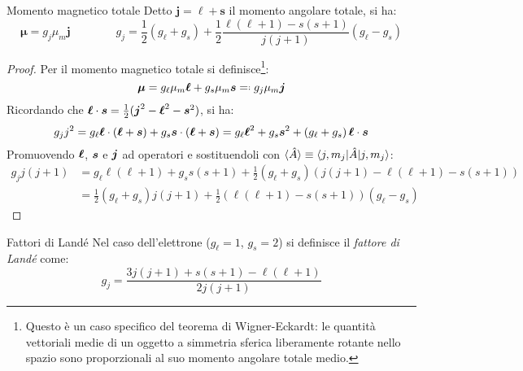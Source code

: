 \begin{proposition}{Momento magnetico totale}{}
	Detto $ \boldsymbol{j} = \boldsymbol{\ell} + \boldsymbol{s} $ il momento angolare totale, si ha:
	\begin{equation}
		\boldsymbol{\mu} = g_j \mu_m \boldsymbol{j}
		\qquad \qquad
		g_j = \frac{1}{2} \left( g_\ell + g_s \right) + \frac{1}{2} \frac{\ell (\ell + 1) - s (s + 1)}{j (j + 1)} \left( g_\ell - g_s \right)
	\end{equation}

	\tcblower

	\begin{proof}
		Per il momento magnetico totale si definisce\footnote{Questo è un caso specifico del teorema di Wigner-Eckardt: le quantità vettoriali medie di un oggetto a simmetria sferica liberamente rotante nello spazio sono proporzionali al suo momento angolare totale medio.}:
		\begin{equation*}
			\bs{\mu} = g_\ell \mu_m \bs{\ell} + g_s \mu_m \bs{s} \eqdef g_j \mu_m \bs{j}
		\end{equation*}
		Ricordando che $ \boldsymbol{\ell} \cdot \boldsymbol{s} = \frac{1}{2} ( \boldsymbol{j}^2 - \boldsymbol{\ell}^2 - \boldsymbol{s}^2 ) $, si ha:
		\begin{equation*}
			g_j j^2 = g_\ell \boldsymbol{\ell} \cdot \left( \boldsymbol{\ell} + \boldsymbol{s} \right) + g_s \boldsymbol{s} \cdot \left( \boldsymbol{\ell} + \boldsymbol{s} \right) = g_\ell \boldsymbol{\ell}^2 + g_s \boldsymbol{s}^2 + \left( g_\ell + g_s \right) \boldsymbol{\ell} \cdot \boldsymbol{s}
		\end{equation*}
		Promuovendo $ \boldsymbol{\ell} $, $ \boldsymbol{s} $ e $ \boldsymbol{j} $ ad operatori e sostituendoli con $ \braket{\hat{A}} \equiv \braket{j,m_j | \hat{A} | j,m_j} $:
		\begin{equation*}
			\begin{split}
				g_j j (j + 1)
				&= g_\ell \ell (\ell + 1) + g_s s (s + 1) + \frac{1}{2} \left( g_\ell + g_s \right) \left( j (j + 1) - \ell (\ell + 1) - s (s + 1) \right) \\
				&= \frac{1}{2} \left( g_\ell + g_s \right) j (j + 1) + \frac{1}{2} \left( \ell (\ell + 1) - s (s + 1) \right) \left( g_\ell - g_s \right)
			\end{split}
		\end{equation*}
	\end{proof}
\end{proposition}

\begin{definition}{Fattori di Landé}{}
	Nel caso dell'elettrone ($ g_\ell = 1 $, $ g_s = 2 $) si definisce il \textit{fattore di Landé} come:
	\begin{equation}
		g_j = \frac{3 j (j + 1) + s (s + 1) - \ell (\ell + 1)}{2 j (j + 1)}
		\label{eq:lande-g-factor}
	\end{equation}
\end{definition}


